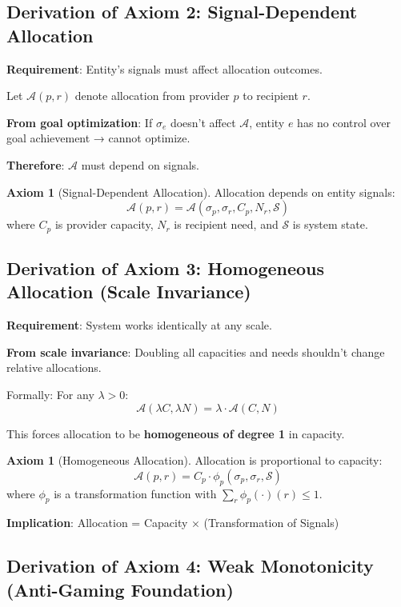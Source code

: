 \documentclass[11pt,a4paper]{article}
\theoremstyle{definition}
\newtheorem{axiom}[theorem]{Axiom}
\theoremstyle{remark}
\begin{document}
\subsection{Derivation of Axiom 2: Signal-Dependent Allocation}

\textbf{Requirement}: Entity's signals must affect allocation outcomes.

Let $\mathcal{A}(p,r)$ denote allocation from provider $p$ to recipient $r$.

\textbf{From goal optimization}: If $\sigma_e$ doesn't affect $\mathcal{A}$, entity $e$ has no control over goal achievement → cannot optimize.

\textbf{Therefore}: $\mathcal{A}$ must depend on signals.

\begin{axiom}[Signal-Dependent Allocation]
Allocation depends on entity signals:
\[ \mathcal{A}(p,r) = \mathcal{A}(\sigma_p, \sigma_r, C_p, N_r, \mathcal{S}) \]
where $C_p$ is provider capacity, $N_r$ is recipient need, and $\mathcal{S}$ is system state.
\end{axiom}

\subsection{Derivation of Axiom 3: Homogeneous Allocation (Scale Invariance)}

\textbf{Requirement}: System works identically at any scale.

\textbf{From scale invariance}: Doubling all capacities and needs shouldn't change relative allocations.

Formally: For any $\lambda > 0$:
\[ \mathcal{A}(\lambda C, \lambda N) = \lambda \cdot \mathcal{A}(C, N) \]

This forces allocation to be \textbf{homogeneous of degree 1} in capacity.

\begin{axiom}[Homogeneous Allocation]
Allocation is proportional to capacity:
\[ \mathcal{A}(p,r) = C_p \cdot \phi_p(\sigma_p, \sigma_r, \mathcal{S}) \]
where $\phi_p$ is a transformation function with $\sum_r \phi_p(\cdot)(r) \le 1$.
\end{axiom}

\textbf{Implication}: Allocation = Capacity × (Transformation of Signals)

\subsection{Derivation of Axiom 4: Weak Monotonicity (Anti-Gaming Foundation)}
\end{document}
